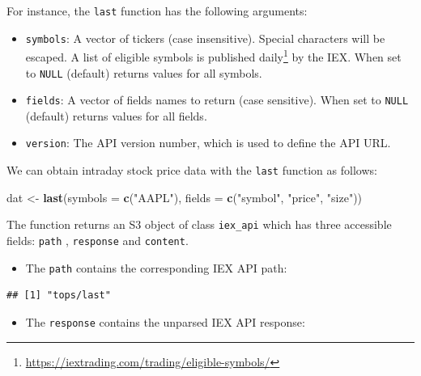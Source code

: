 \documentclass[]{book}
\newenvironment{Shaded}{\begin{snugshade}}{\end{snugshade}}
\newcommand{\KeywordTok}[1]{\textcolor[rgb]{0.13,0.29,0.53}{\textbf{#1}}}
\newcommand{\DataTypeTok}[1]{\textcolor[rgb]{0.13,0.29,0.53}{#1}}
\newcommand{\StringTok}[1]{\textcolor[rgb]{0.31,0.60,0.02}{#1}}
\newcommand{\OperatorTok}[1]{\textcolor[rgb]{0.81,0.36,0.00}{\textbf{#1}}}
\newcommand{\NormalTok}[1]{#1}
\DeclareRobustCommand{\href}[2]{#2\footnote{\url{#1}}}
\providecommand{\tightlist}{%
  \setlength{\itemsep}{0pt}\setlength{\parskip}{0pt}}
\begin{document}
For instance, the \texttt{last} function has the following arguments:

\begin{itemize}
\tightlist
\item
  \texttt{symbols}: A vector of tickers (case insensitive). Special
  characters will be escaped. A list of eligible symbols is
  \href{https://iextrading.com/trading/eligible-symbols/}{published
  daily} by the IEX. When set to \texttt{NULL} (default) returns values
  for all symbols.
\item
  \texttt{fields}: A vector of fields names to return (case sensitive).
  When set to \texttt{NULL} (default) returns values for all fields.
\item
  \texttt{version}: The API version number, which is used to define the
  API URL.
\end{itemize}

We can obtain intraday stock price data with the \texttt{last} function
as follows:

\begin{Shaded}
\begin{Highlighting}[]
\NormalTok{dat <-}\StringTok{ }\KeywordTok{last}\NormalTok{(}\DataTypeTok{symbols =} \KeywordTok{c}\NormalTok{(}\StringTok{"AAPL"}\NormalTok{), }\DataTypeTok{fields =} \KeywordTok{c}\NormalTok{(}\StringTok{"symbol"}\NormalTok{, }\StringTok{"price"}\NormalTok{, }
  \StringTok{"size"}\NormalTok{))}
\end{Highlighting}
\end{Shaded}

The function returns an S3 object of class \texttt{iex\_api} which has
three accessible fields: \texttt{path} , \texttt{response} and
\texttt{content}.

\begin{itemize}
\tightlist
\item
  The \texttt{path} contains the corresponding IEX API path:
\end{itemize}

\begin{Shaded}
\end{Shaded}

\begin{verbatim}
## [1] "tops/last"
\end{verbatim}

\begin{itemize}
\tightlist
\item
  The \texttt{response} contains the unparsed IEX API response:
\end{itemize}
\end{document}
